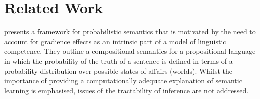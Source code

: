 \documentclass[manuscript]{clv2}
\newcommand{\newcite}[1]{\namecite{#1}}
\begin{document}



\section{Related Work}


\newcite{Eijck:12} presents a framework for probabilistic semantics that is motivated by the need to account for gradience effects as an intrinsic part of a model of linguistic competence. They outline a compositional semantics for a propositional language in which the probability of the truth of a sentence is defined in terms of a probability distribution over possible states of affairs (worlds). Whilst the importance of providing a computationally adequate explanation of semantic learning is emphasised, issues of the tractability of inference are not addressed. 
\end{document}
